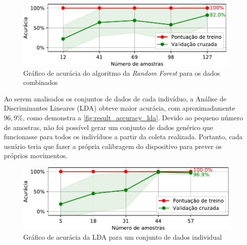 \begin{figure}[ht]
	\caption{\label{fig:result_accuracy_rfc}Gráfico de acurácia do algoritmo da \textit{Random Forest} para os dados combinados}
	\begin{center}
	    \includegraphics[width=\textwidth]{resources/result_accuracy_rfc}
	\end{center}
\end{figure}

Ao serem analisados os conjuntos de dados de cada indivíduo, a Análise de Discriminantes Lineares (LDA) obteve maior acurácia, com aproximadamente \(96{,}9\%\), como demonstra a \autoref{fig:result_accuracy_lda}. Devido ao pequeno número de amostras, não foi possível gerar um conjunto de dados genérico que funcionasse para todos os indivíduos a partir da coleta realizada. Portanto, cada usuário teria que fazer a própria calibragem do dispositivo para prever os próprios movimentos.

\begin{figure}[ht]
	\caption{\label{fig:result_accuracy_lda}Gráfico de acurácia da LDA para um conjunto de dados individual}
	\begin{center}
	    \includegraphics[width=\textwidth]{resources/result_accuracy_lda}
	\end{center}
\end{figure}


